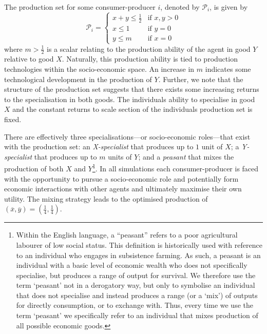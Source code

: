 The production set for some consumer-producer $i$, denoted by $\mathcal{P}_{i}$, is given by
\[ \mathcal{P}_{i} = \left\{ \begin{array}{ll}
         x + y \leqslant \frac{1}{2} & \mbox{if $x,y > 0$}\\
		 x \leqslant 1 & \mbox{if $y = 0$}\\
         y \leqslant m & \mbox{if $x = 0$}\end{array} \right. \]
where $m > \frac{1}{2}$ is a scalar relating to the production ability of the agent in good $Y$ relative to good $X$. Naturally, this production ability is tied to production technologies within the socio-economic space. An increase in $m$ indicates some technological development in the production of $Y$. Further, we note that the structure of the production set suggests that there exists some increasing returns to the specialisation in both goods. The individuals ability to specialise in good $X$ and the constant returns to scale section of the individuals production set is fixed.


There are effectively three specialisations---or socio-economic roles---that exist with the production set: an \emph{X-specialist} that produces up to $1$ unit of $X$; a \emph{Y-specialist} that produces up to $m$ units of $Y$; and a \emph{peasant} that mixes the production of both $X$ and $Y$\footnote{Within the English language, a ``peasant'' refers to a poor agricultural labourer of low social status. This definition is historically used with reference to an individual who engages in subsistence farming. As such, a peasant is an individual with a basic level of economic wealth who does not specifically specialise, but produces a range of output for survival. We therefore use the term `peasant' not in a derogatory way, but only to symbolise an individual that does not specialise and instead produces a range (or a `mix') of outputs for directly consumption, or to exchange with. Thus, every time we use the term `peasant' we specifically refer to an individual that mixes production of all possible economic goods.}. In all simulations each consumer-producer is faced with the opportunity to pursue a socio-economic role and potentially form economic interactions with other agents and ultimately maximise their own utility. The mixing strategy leads to the optimised production of $(\overline{x},\overline{y})=\left( \frac{1}{4},\frac{1}{4} \right)$.


